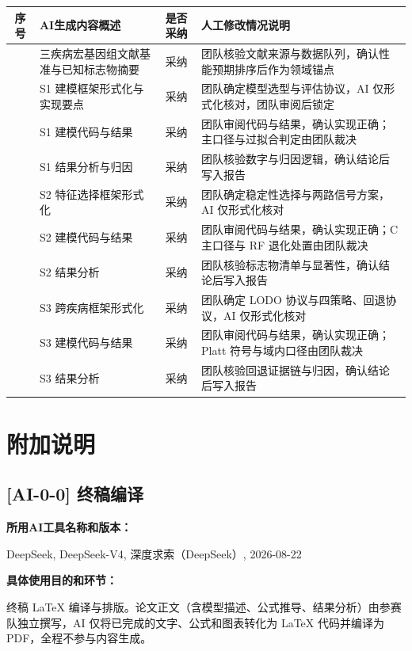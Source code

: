\documentclass[12pt,a4paper]{ctexart}
\begin{document}
\begin{longtable}{|c|p{5.2cm}|c|p{5.2cm}|}
\hline
序号 & AI生成内容概述 & 是否采纳 & 人工修改情况说明 \\
\hline
[AI-1-1] & 三疾病宏基因组文献基准与已知标志物摘要 & 采纳 & 团队核验文献来源与数据队列，确认性能预期排序后作为领域锚点 \\
\hline
[AI-1-2] & S1 建模框架形式化与实现要点 & 采纳 & 团队确定模型选型与评估协议，AI 仅形式化核对，团队审阅后锁定 \\
\hline
[AI-1-3] & S1 建模代码与结果 & 采纳 & 团队审阅代码与结果，确认实现正确；主口径与过拟合判定由团队裁决 \\
\hline
[AI-1-4] & S1 结果分析与归因 & 采纳 & 团队核验数字与归因逻辑，确认结论后写入报告 \\
\hline
[AI-2-1] & S2 特征选择框架形式化 & 采纳 & 团队确定稳定性选择与两路信号方案，AI 仅形式化核对 \\
\hline
[AI-2-2] & S2 建模代码与结果 & 采纳 & 团队审阅代码与结果，确认实现正确；C 主口径与 RF 退化处置由团队裁决 \\
\hline
[AI-2-3] & S2 结果分析 & 采纳 & 团队核验标志物清单与显著性，确认结论后写入报告 \\
\hline
[AI-3-1] & S3 跨疾病框架形式化 & 采纳 & 团队确定 LODO 协议与四策略、回退协议，AI 仅形式化核对 \\
\hline
[AI-3-2] & S3 建模代码与结果 & 采纳 & 团队审阅代码与结果，确认实现正确；Platt 符号与域内口径由团队裁决 \\
\hline
[AI-3-3] & S3 结果分析 & 采纳 & 团队核验回退证据链与归因，确认结论后写入报告 \\
\hline
\end{longtable}

\section*{附加说明}

\subsection*{[AI-0-0] 终稿编译}

\textbf{所用AI工具名称和版本：}

DeepSeek, DeepSeek-V4, 深度求索（DeepSeek）, 2026-08-22

\textbf{具体使用目的和环节：}

终稿 LaTeX 编译与排版。论文正文（含模型描述、公式推导、结果分析）由参赛队独立撰写，AI 仅将已完成的文字、公式和图表转化为 LaTeX 代码并编译为 PDF，全程不参与内容生成。
\end{document}
